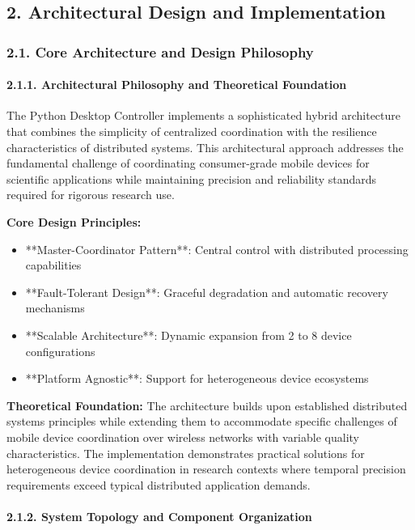 \documentclass[12pt,a4paper]{article}
\begin{document}
\subsection{2. Architectural Design and Implementation}

\subsubsection{2.1. Core Architecture and Design Philosophy}

\paragraph{2.1.1. Architectural Philosophy and Theoretical Foundation}

The Python Desktop Controller implements a sophisticated hybrid architecture that combines the simplicity of centralized
coordination with the resilience characteristics of distributed systems. This architectural approach addresses the
fundamental challenge of coordinating consumer-grade mobile devices for scientific applications while maintaining
precision and reliability standards required for rigorous research use.

\textbf{Core Design Principles:}

\begin{itemize}
\item **Master-Coordinator Pattern**: Central control with distributed processing capabilities
\item **Fault-Tolerant Design**: Graceful degradation and automatic recovery mechanisms
\item **Scalable Architecture**: Dynamic expansion from 2 to 8 device configurations
\item **Platform Agnostic**: Support for heterogeneous device ecosystems

\end{itemize}
\textbf{Theoretical Foundation:}
The architecture builds upon established distributed systems principles while extending them to accommodate specific
challenges of mobile device coordination over wireless networks with variable quality characteristics. The
implementation demonstrates practical solutions for heterogeneous device coordination in research contexts where
temporal precision requirements exceed typical distributed application demands.

\paragraph{2.1.2. System Topology and Component Organization}
\end{document}
